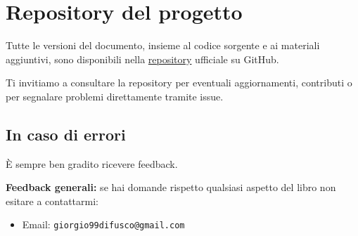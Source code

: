 \section{Repository del progetto}
Tutte le versioni del documento, insieme al codice sorgente e ai materiali aggiuntivi, sono disponibili nella \href{https://github.com/Giordi9902/unina_algebra_notes}{repository} ufficiale su GitHub.

Ti invitiamo a consultare la repository per eventuali aggiornamenti, contributi o per segnalare problemi direttamente tramite issue.

\subsection{In caso di errori}
È sempre ben gradito ricevere feedback.

\textbf{Feedback generali:} se hai domande rispetto qualsiasi aspetto del libro non esitare a contattarmi:
\begin{itemize}
	\item Email: \texttt{giorgio99difusco@gmail.com}
\end{itemize}
